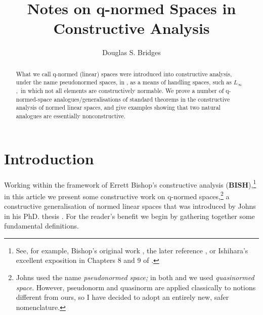 \documentclass[11pt]{article}%
\begin{document}
\date{}
\title{\textsf{Notes on q-normed Spaces in Constructive Analysis}}
\author{\textsf{Douglas S. Bridges}}
\maketitle

\begin{abstract}%
\noindent
\textsf{What we call q-normed (linear) spaces were introduced into
constructive analysis, under the name pseudonormed spaces, in \cite{Johns}, as
a means of handling spaces, such as }$L_{\infty}$,\textsf{\ in which not all
elements are constructively normable. We prove a number of q-normed-space
analogues/generalisations of standard theorems in the constructive analysis of
normed linear spaces, and give examples showing that two natural analogues are
essentially nonconstructive.}

\end{abstract}

%

\setcounter{secnumdepth}{0}%
\normalfont\sf


\section{Introduction}

Working within the framework of Errett Bishop's constructive analysis
(\textbf{BISH}),\footnote{%
\normalfont\sf
See, for example, Bishop's original work \textsf{\cite{Bishop}, }the later
reference \cite{BVtech}, or Ishihara's excellent exposition in Chapters 8 and
9 of \cite{Handbook}.} in this article we present some constructive work on
q-normed spaces,\footnote{%
\normalfont\sf
Johns \cite{Johns} used the name \emph{pseudonormed space;} in both
\textsf{\cite[Chap. 7, Sect. 5]{BB} and \cite{dsbconvex} we used
}\emph{quasinormed space}. However, pseudonorm and quasinorm are applied
classically to notions different from ours, so I have decided to adopt an
entirely new, safer nomenclature.} a constructive generalisation of normed
linear spaces that was introduced by Johns in his PhD. thesis \cite{Johns}.
For the reader's benefit we begin by gathering together some fundamental definitions.
\end{document}
